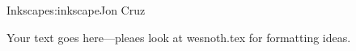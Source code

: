 \begin{aosachapter}{Inkscape}{s:inkscape}{Jon Cruz}

Your text goes here---pleaes look at wesnoth.tex for formatting ideas.

\end{aosachapter}
